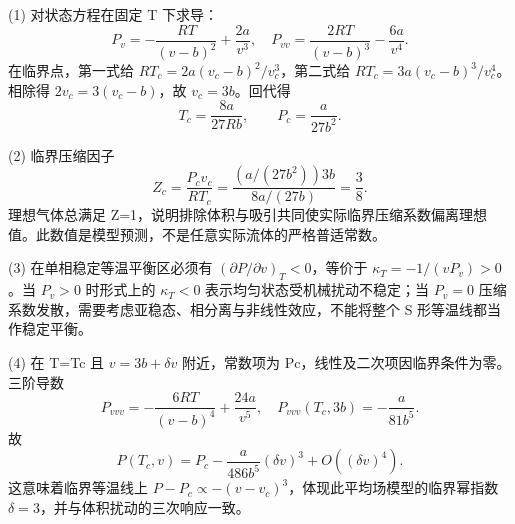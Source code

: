 (1) 对状态方程在固定 T 下求导：
\[
P_v=-\frac{RT}{(v-b)^2}+\frac{2a}{v^3},\quad
P_{vv}=\frac{2RT}{(v-b)^3}-\frac{6a}{v^4}.
\]
在临界点，第一式给 \(RT_c=2a(v_c-b)^2/v_c^3\)，第二式给 \(RT_c=3a(v_c-b)^3/v_c^4\)。相除得 \(2v_c=3(v_c-b)\)，故 \(v_c=3b\)。回代得
\[
T_c=\frac{8a}{27Rb},\qquad P_c=\frac{a}{27b^2}.
\]

(2) 临界压缩因子
\[
Z_c=\frac{P_cv_c}{RT_c}
=\frac{(a/(27b^2))3b}{8a/(27b)}=\frac38.
\]
理想气体总满足 Z=1，说明排除体积与吸引共同使实际临界压缩系数偏离理想值。此数值是模型预测，不是任意实际流体的严格普适常数。

(3) 在单相稳定等温平衡区必须有 \((\partial P/\partial v)_T<0\)，等价于 \(\kappa_T=-1/(vP_v)>0\)。当 \(P_v>0\) 时形式上的 \(\kappa_T<0\) 表示均匀状态受机械扰动不稳定；当 \(P_v=0\) 压缩系数发散，需要考虑亚稳态、相分离与非线性效应，不能将整个 S 形等温线都当作稳定平衡。

(4) 在 T=Tc 且 \(v=3b+\delta v\) 附近，常数项为 Pc，线性及二次项因临界条件为零。三阶导数
\[
P_{vvv}=-\frac{6RT}{(v-b)^4}+\frac{24a}{v^5},
\quad
P_{vvv}(T_c,3b)=-\frac{a}{81b^5}.
\]
故
\[
P(T_c,v)=P_c-\frac{a}{486b^5}(\delta v)^3+O((\delta v)^4).
\]
这意味着临界等温线上 \(P-P_c\propto-(v-v_c)^3\)，体现此平均场模型的临界幂指数 \(\delta =3\)，并与体积扰动的三次响应一致。
